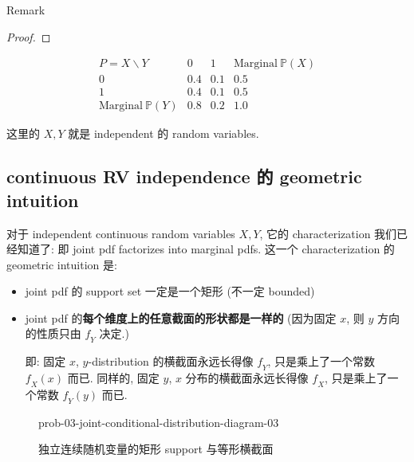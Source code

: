 \begin{qlremark}{Remark}
\begin{proof}
\end{proof}

\begin{example}

\[\begin{matrix}
{\mathit{P} = \mathit{X} \smallsetminus \mathit{Y}} & 0 & {1\ } & {\text{Marginal}\ \mathbb{P}(\mathit{X})} \\
0 & 0.4 & 0.1 & 0.5 \\
1 & 0.4 & 0.1 & 0.5 \\
{\text{Marginal}\ \mathbb{P}(\mathit{Y})} & 0.8 & 0.2 & 1.0
\end{matrix}\]

这里的 \(\mathit{X},\mathit{Y}\) 就是 independent 的 random variables.

\end{example}

\end{qlremark}

\subsection{continuous RV independence 的 geometric intuition}\label{continuous-rv-independence-ux7684-geometric-intuition}

对于 independent continuous random variables \(\mathit{X},\mathit{Y}\), 它的 characterization 我们已经知道了: 即 joint pdf factorizes into marginal pdfs. 这一个 characterization 的 geometric intuition 是:

\begin{itemize}
\item
  joint pdf 的 support set 一定是一个矩形 (不一定 bounded)
\item
  joint pdf 的\textbf{每个维度上的任意截面的形状都是一样的} (因为固定 \(\mathit{x}\), 则 \(\mathit{y}\) 方向的性质只由 \(\mathit{f}_{\mathit{Y}}\) 决定.)

  即: 固定 \(\mathit{x}\), \(\mathit{y}\)-distribution 的横截面永远长得像 \(\mathit{f}_{\mathit{Y}}\), 只是乘上了一个常数 \(\mathit{f}_{\mathit{X}}(\mathit{x})\) 而已. 同样的, 固定 \(\mathit{y}\), \(\mathit{x}\) 分布的横截面永远长得像 \(\mathit{f}_{\mathit{X}}\), 只是乘上了一个常数 \(\mathit{f}_{\mathit{Y}}(\mathit{y})\) 而已.
\end{itemize}

\begin{figure}[htbp]
\centering
\begin{qldrawing}
\csname prob-03-joint-conditional-distribution-diagram-03\endcsname
\end{qldrawing}

\caption{独立连续随机变量的矩形 support 与等形横截面}

\label{fig-prob-03-joint-conditional-distribution-diagram-03}

\end{figure}

